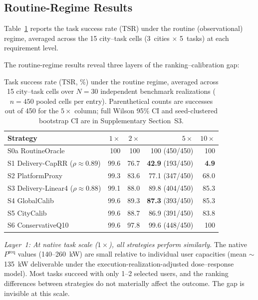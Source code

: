 \documentclass[utf8]{FrontiersinHarvard}
\newcommand{\Preq}{P^{\mathrm{req}}}
\begin{document}
\subsection{Routine-Regime Results}

Table~\ref{tab:routine_tsr} reports the task success rate (TSR)
under the routine (observational) regime, averaged across the 15
city--task cells (3~cities $\times$ 5~tasks) at each requirement
level.

The routine-regime results reveal three layers of the
ranking--calibration gap:

\begin{table}[h!]
\centering
\caption{Task success rate (TSR, \%) under the routine regime,
averaged across 15 city--task cells over $N=30$ independent
benchmark realizations ($n=450$ pooled cells per entry).
Parenthetical counts are successes out of 450 for the $5\times$
column; full Wilson 95\% CI and seed-clustered bootstrap CI
are in Supplementary Section~S3.}
\label{tab:routine_tsr}
\begin{tabular}{lrrrr}
\toprule
\textbf{Strategy} & \textbf{$1\times$} & \textbf{$2\times$}
& \textbf{$5\times$} & \textbf{$10\times$} \\
\midrule
S0a RoutineOracle & 100 & 100 & 100 (450/450) & 100 \\
S1 Delivery-CapRR ($\rho{\approx}0.89$) & 99.6 & 76.7 & \textbf{42.9} (193/450) & \textbf{4.9} \\
S2 PlatformProxy & 99.3 & 83.6 & 77.1 (347/450) & 68.0 \\
S3 Delivery-Linear4 ($\rho{\approx}0.88$) & 99.1 & 88.0 & 89.8 (404/450) & 85.3 \\
S4 GlobalCalib & 99.6 & 89.3 & \textbf{87.3} (393/450) & 85.3 \\
S5 CityCalib & 99.6 & 88.7 & 86.9 (391/450) & 83.8 \\
S6 ConservativeQ10 & 99.6 & 97.8 & 99.6 (448/450) & 100 \\
\bottomrule
\end{tabular}
\end{table}



\textit{Layer~1: At native task scale ($1\times$), all strategies
perform similarly.} The native $\Preq$ values (140--260~kW) are
small relative to individual user capacities (mean
$\sim$135~kW deliverable under the execution-realization-adjusted
dose--response model). Most tasks succeed with only 1--2
selected users, and the ranking differences between strategies
do not materially affect the outcome. The gap is invisible at
this scale.
\end{document}
